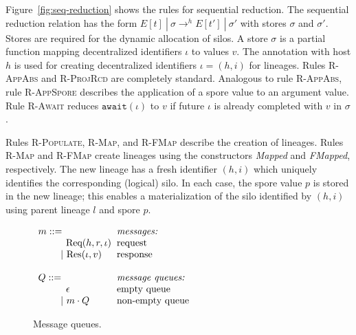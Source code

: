 Figure~\ref{fig:seq-reduction} shows the rules for sequential
reduction. The sequential reduction relation has the form
$E[t]~|~\sigma \rightarrow^h E[t']~|~\sigma'$ with stores $\sigma$ and
$\sigma'$. Stores are required for the dynamic allocation of silos. A
store $\sigma$ is a partial function mapping decentralized identifiers
$\iota$ to values $v$.  The annotation with host $h$ is used for
creating decentralized identifiers $\iota = (h, i)$ for lineages.
Rules \textsc{R-AppAbs} and \textsc{R-ProjRcd} are completely
standard.  Analogous to rule \textsc{R-AppAbs}, rule
\textsc{R-AppSpore} describes the application of a spore value to an
argument value. Rule \textsc{R-Await} reduces $\texttt{await}(\iota)$
to $v$ if future $\iota$ is already completed with $v$ in $\sigma$.

Rules \textsc{R-Populate}, \textsc{R-Map}, and \textsc{R-FMap}
describe the creation of lineages.  Rules \textsc{R-Map} and
\textsc{R-FMap} create lineages using the constructors {\em Mapped}
and {\em FMapped}, respectively. The new lineage has a fresh
identifier $(h, i)$ which uniquely identifies the corresponding
(logical) silo. In each case, the spore value $p$ is stored in the new
lineage; this enables a materialization of the silo identified by $(h,
i)$ using parent lineage $l$ and spore $p$.


\begin{figure}
\centering
$\ba[t]{l@{\hspace{2mm}}l}
m      ::= & \mbox{{\it{messages:}}} \\
\gap \:\:\:\: {\Req h r \iota}      & \mbox{request} \\
\gap ~|~      {\Res \iota v}        & \mbox{response} \\
 & \\
Q      ::=                          & \mbox{{\it{message queues:}}} \\
\gap \:\:\:\: \epsilon  & \mbox{empty queue} \\
\gap ~|~    m \cdot Q      & \mbox{non-empty queue} \\
\ea$
\caption{Message queues.}\label{fig:queues}
\end{figure}

